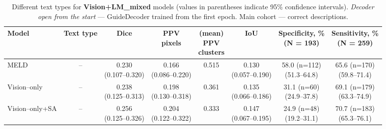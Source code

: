 \documentclass[FCD_GNN.tex]{subfiles}
\begin{document}
\begin{table}[H]
\centering
\tiny
\caption{Different text types for \textbf{Vision+LM\_mixed} models (values in parentheses indicate 95\% confidence intervals). \emph{Decoder open from the start} — GuideDecoder trained from the first epoch. Main cohort — correct descriptions.}

\label{tab:main_cohort_mixed_correct}
\begin{tabular}{lccccccc}
\textbf{Model} &
\textbf{Text type} &
\textbf{Dice} &
\makecell{\textbf{PPV}\\\textbf{pixels}} &
\makecell{\textbf{(mean)} \\\textbf{PPV} \\\textbf{clusters}} & 
\textbf{IoU} & 
\makecell{\textbf{Specificity, \%} \\ (N = 193)}&
\makecell{\textbf{Sensitivity, \%} \\ (N = 259)}\\
\hline
MELD & -- &
\makecell{0.230\\(0.107--0.320)} &
\makecell{0.166\\(0.086--0.220)} &
\colorbox{green!15}{0.515} &
\makecell{0.130\\(0.057--0.190)} &
\makecell{58.0 (n=112) \\ (51.3--64.8)}&
\makecell{65.6 (n=170) \\ (59.8--71.4)} \\
\hline
Vision--only & -- &
\makecell{0.238\\(0.125--0.313)} &
\makecell{0.198\\(0.130--0.318)} &
0.361 &
\makecell{0.135\\(0.066--0.186)} &
\makecell{31.1 (n=60) \\ (24.9--37.8)} &
\makecell{\colorbox{orange!15}{69.1 (n=179)} \\ (63.3--74.9)} \\
\hline
Vision--only+SA & -- &
\makecell{\colorbox{green!15}{0.256} \\ (0.125--0.326)} &
\makecell{0.204\\ (0.122--0.322)} &
0.333 &
\makecell{\colorbox{green!15}{0.147}\\ (0.067--0.195)} &
\makecell{24.9 (n=48) \\ (19.2--31.1)} &
\makecell{\colorbox{green!15}{70.7 (n=183)} \\ (65.3--76.1)} \\

\end{tabular}
\end{table}
\end{document}

